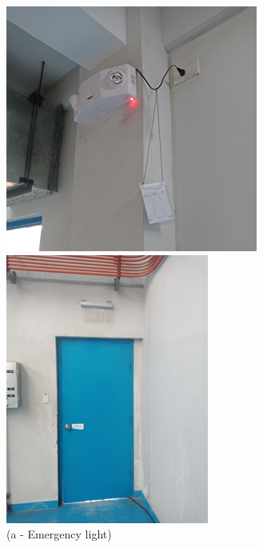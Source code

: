 \begin{figure}[h]

	\begin{minipage}[b]{0.22\linewidth}
		\centering
		\includegraphics[width=\textwidth]{figures/ch04_fig_safety03}
		\caption*{(a - Emergency light)}
	\end{minipage}
	\hspace{0.03cm}
\begin{minipage}[b]{0.22\linewidth}
	\centering
	\includegraphics[width=\textwidth]{figures/ch04_fig_safety04}

\end{minipage}
\end{figure}
